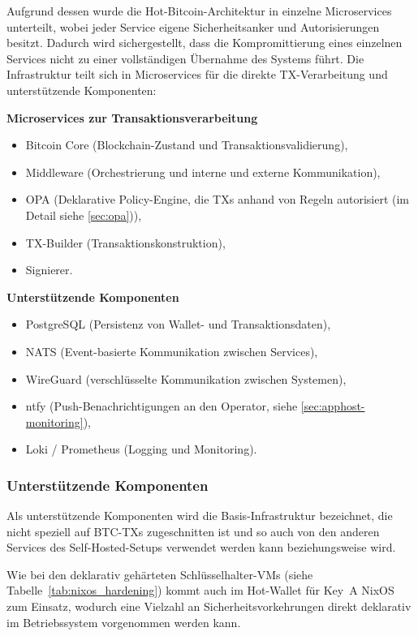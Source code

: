 Aufgrund dessen wurde die Hot-Bitcoin-Architektur in einzelne Microservices unterteilt, wobei jeder Service eigene Sicherheitsanker und Autorisierungen besitzt.
Dadurch wird sichergestellt, dass die Kompromittierung eines einzelnen Services nicht zu einer vollständigen Übernahme des Systems führt.
Die Infrastruktur teilt sich in Microservices für die direkte \ac{TX}-Verarbeitung und unterstützende Komponenten:

\textbf{Microservices zur Transaktionsverarbeitung}
\begin{itemize}
    \item Bitcoin Core (Blockchain-Zustand und Transaktionsvalidierung),
    \item Middleware (Orchestrierung und interne und externe Kommunikation),
    \item \ac{OPA} (Deklarative Policy-Engine, die \acp{TX} anhand von Regeln autorisiert (im Detail siehe \ref{sec:opa})),
    \item TX-Builder (Transaktionskonstruktion),
    \item Signierer.
\end{itemize}
\textbf{Unterstützende Komponenten}
\begin{itemize}
    \item PostgreSQL (Persistenz von Wallet- und Transaktionsdaten),
    \item \ac{NATS} (Event-basierte Kommunikation zwischen Services),
    \item WireGuard (verschlüsselte Kommunikation zwischen Systemen),
    \item ntfy (Push-Benachrichtigungen an den Operator, siehe \ref{sec:apphost-monitoring}),
    \item Loki / Prometheus (Logging und Monitoring).
\end{itemize}

\subsubsection{Unterstützende Komponenten}
Als unterstützende Komponenten wird die Basis-Infrastruktur bezeichnet, die nicht speziell auf \ac{BTC}-\acp{TX} zugeschnitten ist und so auch von den anderen Services des Self-Hosted-Setups verwendet werden kann beziehungsweise wird.

Wie bei den deklarativ gehärteten Schlüsselhalter-\acp{VM} (siehe Tabelle~\ref{tab:nixos_hardening}) kommt auch im Hot-Wallet für Key~A NixOS zum Einsatz, wodurch eine Vielzahl an Sicherheitsvorkehrungen direkt deklarativ im Betriebssystem vorgenommen werden kann.

